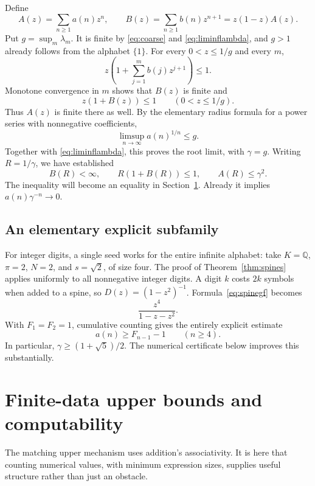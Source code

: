 \documentclass[11pt,letterpaper]{article}
\numberwithin{equation}{section}
\theoremstyle{definition}
\newcommand{\Q}{\mathbb Q}
\begin{document}
Define
\begin{equation}\label{eq:AB}
 A(z)=\sum_{n\ge1}a(n)z^n,\qquad
 B(z)=\sum_{n\ge1}b(n)z^{n+1}=z(1-z)A(z).
\end{equation}
Put $g=\sup_m\lambda_m$. It is finite by \eqref{eq:coarse} and
\eqref{eq:liminflambda}, and $g>1$ already follows from the alphabet $\{1\}$.
For every $0<z\le1/g$ and every $m$,
\[
 z\left(1+\sum_{j=1}^m b(j)z^{j+1}\right)\le1.
\]
Monotone convergence in $m$ shows that $B(z)$ is finite and
\begin{equation}\label{eq:boundaryinequality}
 z(1+B(z))\le1 \qquad(0<z\le1/g).
\end{equation}
Thus $A(z)$ is finite there as well. By the elementary radius formula for a
power series with nonnegative coefficients,
\[
 \limsup_{n\to\infty}a(n)^{1/n}\le g.
\]
Together with \eqref{eq:liminflambda}, this proves the root limit, with
$\gamma=g$. Writing $R=1/\gamma$, we have established
\begin{equation}\label{eq:initial-boundary}
 B(R)<\infty,\qquad R(1+B(R))\le1,
 \qquad A(R)\le\gamma^2.
\end{equation}
The inequality will become an equality in Section~\ref{sec:effective}.
Already it implies $a(n)\gamma^{-n}\to0$.

\subsection{An elementary explicit subfamily}

For integer digits, a single seed works for the entire infinite alphabet:
take $K=\Q$, $\pi=2$, $N=2$, and $s=\sqrt2$, of size four.
The proof of Theorem~\ref{thm:spines} applies uniformly to all nonnegative
integer digits. A digit $k$ costs $2k$ symbols when added to a spine, so
$D(z)=(1-z^2)^{-1}$. Formula~\eqref{eq:spinegf} becomes
\[
 \frac{z^4}{1-z-z^2}.
\]
With $F_1=F_2=1$, cumulative counting gives the entirely explicit estimate
\begin{equation}\label{eq:fibonacci}
 a(n)\ge F_{n-1}-1\qquad(n\ge4).
\end{equation}
In particular, $\gamma\ge(1+\sqrt5)/2$. The numerical certificate below
improves this substantially.

\section{Finite-data upper bounds and computability}\label{sec:effective}

The matching upper mechanism uses addition's associativity. It is here that
counting numerical values, with minimum expression sizes, supplies useful
structure rather than just an obstacle.
\end{document}

